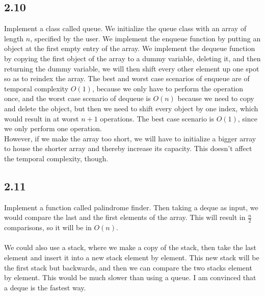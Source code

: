 \documentclass[letterpaper,12pt]{article}
\theoremstyle{definition}
\begin{document}
\subsection*{2.10}
Implement a class called queue. We initialize the queue class with an array of length $n$, specified by the user. We implement the enqueue function by putting an object at the first empty entry of the array. We implement the dequeue function by copying the first object of the array to a dummy variable, deleting it, and then returning the dummy variable, we will then shift every other element up one spot so as to reindex the array. The best and worst case scenarios of enqueue are of temporal complexity $O(1)$, because we only have to perform the operation once, and the worst case scenario of dequeue is $O(n)$ because we need to copy and delete the object, but then we need to shift every object by one index, which would result in at worst $n+1$ operations. The best case scenario is $O(1)$, since we only perform one operation.\\
However, if we make the array too short, we will have to initialize a bigger array to house the shorter array and thereby increase its capacity. This doesn't affect the temporal complexity, though. 

\subsection*{2.11}
Implement a function called palindrome finder. Then taking a deque as input, we would compare the last and the first elements of the array. This will result in $\frac{n}{2}$ comparisons, so it will be in $O(n)$.
\\
\\We could also use a stack, where we make a copy of the stack, then take the last element and insert it into a new stack element by element. This new stack will be the first stack but backwards, and then we can compare the two stacks element by element. This would be much slower than using a queue. I am convinced that a deque is the fastest way.
\end{document}
